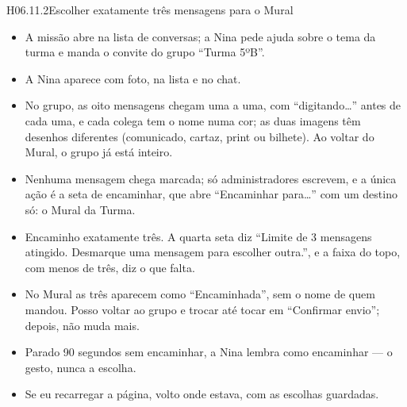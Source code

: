 \begin{historia}{H06.11.2}{Escolher exatamente três mensagens para o Mural}{\pronto}
\aceite
\begin{itemize}
  \item A missão abre na lista de conversas; a Nina pede ajuda sobre o tema da
    turma e manda o convite do grupo \enquote{Turma 5ºB}.
  \item A Nina aparece com foto, na lista e no chat.
  \item No grupo, as oito mensagens chegam uma a uma, com \enquote{digitando\ldots}
    antes de cada uma, e cada colega tem o nome numa cor; as duas imagens têm
    desenhos diferentes (comunicado, cartaz, print ou bilhete). Ao voltar do
    Mural, o grupo já está inteiro.
  \item Nenhuma mensagem chega marcada; só
    administradores escrevem, e a única ação é a seta de encaminhar, que abre
    \enquote{Encaminhar para\ldots} com um destino só: o Mural da Turma.
  \item Encaminho exatamente três. A quarta seta diz \enquote{Limite de 3
    mensagens atingido. Desmarque uma mensagem para escolher outra.}, e a faixa
    do topo, com menos de três, diz o que falta.
  \item No Mural as três aparecem como \enquote{Encaminhada}, sem o nome de
    quem mandou. Posso voltar ao grupo e trocar até tocar em \enquote{Confirmar
    envio}; depois, não muda mais.
  \item Parado 90 segundos sem encaminhar, a Nina lembra como encaminhar --- o
    gesto, nunca a escolha.
  \item Se eu recarregar a página, volto onde estava, com as escolhas
    guardadas.
\end{itemize}
\end{historia}

